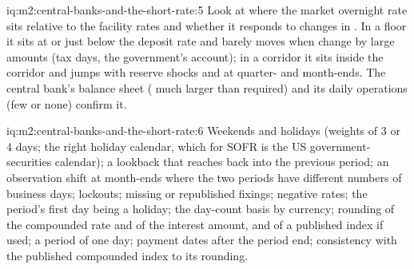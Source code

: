 \begin{solution}{iq:m2:central-banks-and-the-short-rate:5}
Look at where the market overnight rate sits relative to the facility rates
and whether it responds to changes in . In a floor it sits at or just
below the deposit rate and barely moves when  change by large
amounts (tax days, the government's account); in a corridor it sits inside
the corridor and jumps with reserve shocks and at quarter- and month-ends.
The central bank's balance sheet ( much larger than required) and its
daily operations (few or none) confirm it.
\end{solution}

\begin{solution}{iq:m2:central-banks-and-the-short-rate:6}
Weekends and holidays (weights of 3 or 4 days; the right holiday calendar,
which for SOFR is the US government-securities calendar); a lookback that
reaches back into the previous period; an observation shift at month-ends
where the two periods have different numbers of business days; lockouts;
missing or republished fixings; negative rates; the period's first day being a
holiday; the day-count basis by currency; rounding of the compounded rate
and of the interest amount, and of a published index if used; a period of one
day; payment dates after the period end; consistency with the published
compounded index to its rounding.
\end{solution}

